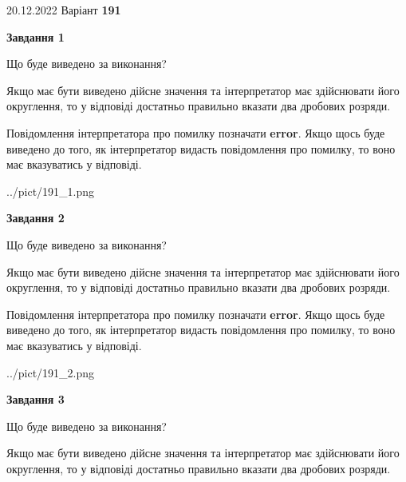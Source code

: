 \documentclass[12pt, ukrainian]{article}
\begin{document}
{20.12.2022 Варіант \No \textbf { 191 }\par}
{
\begin {Large}

{\begin {center}\textbf{Завдання 1}\end {center}}\par
Що буде виведено за виконання? \par

Якщо має бути виведено дійсне значення та інтерпретатор має здійснювати його округлення, 
то у відповіді достатньо правильно вказати два дробових розряди.

Повідомлення інтерпретатора про помилку позначати \textbf{error}.
Якщо щось буде виведено до того, як інтерпретатор видасть повідомлення про помилку, 
то воно має вказуватись у відповіді. \par

\begin{center}
	{../pict/191_1.png}
\end{center}
\newpage

{\begin {center}\textbf{Завдання 2}\end {center}}\par
Що буде виведено за виконання? \par

Якщо має бути виведено дійсне значення та інтерпретатор має здійснювати його округлення, 
то у відповіді достатньо правильно вказати два дробових розряди.

Повідомлення інтерпретатора про помилку позначати \textbf{error}.
Якщо щось буде виведено до того, як інтерпретатор видасть повідомлення про помилку, 
то воно має вказуватись у відповіді. \par

\begin{center}
	{../pict/191_2.png}
\end{center}
\newpage

{\begin {center}\textbf{Завдання 3}\end {center}}\par
Що буде виведено за виконання? \par

Якщо має бути виведено дійсне значення та інтерпретатор має здійснювати його округлення, 
то у відповіді достатньо правильно вказати два дробових розряди.


\end{Large}}
\end{document}
